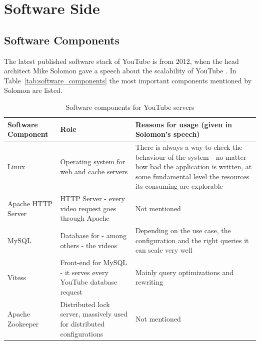 \section{Software Side}
\label{sec:software_side}
\subsection{Software Components}

The latest published software stack of YouTube is from 2012, when the head architect Mike Solomon gave a speech about the scalability of YouTube \cite{misc:scalibility_at_youtube, misc:hihgscalibility}. In Table~\vref{tab:software_components} the most important components mentioned by Solomon are listed.\\

\begin{table}[htbp]
  \begin{center}
    \begin{tabularx}{\textwidth}{|p{}|p{}|X|}
      \hline
      \textbf{Software \newline Component} & \textbf{Role} & \textbf{Reasons for usage} \newline (given in Solomon's speech) \\
      \hline
      \hline
      Linux & Operating system for web and cache servers & There is always a way to check the behaviour of the system - no matter how bad the application is written, at some fundamental level the resources its consuming are explorable \\
      \hline
      Apache \newline HTTP Server & HTTP Server - every video request goes through Apache & Not mentioned \\
      \hline
      MySQL & Database for - among others - the videos & Depending on the use case, the configuration and the right queries it can scale very well \\
      \hline
      Vitess & Front-end for MySQL - it serves every YouTube database request & Mainly query optimizations and rewriting \\
      \hline
      Apache Zookeeper & Distributed lock server, massively used for distributed configurations & Not mentioned \\
      \hline
    \end{tabularx}
    \caption{Software components for YouTube servers}
    \label{tab:software_components}
  \end{center}
\end{table}

